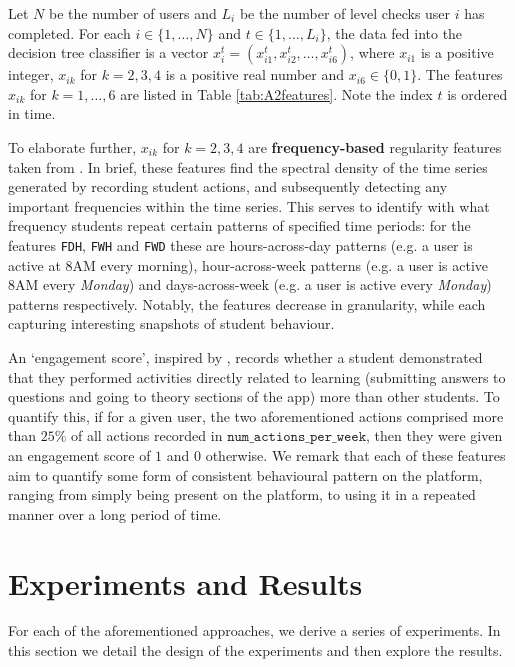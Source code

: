 \documentclass[sigplan,screen]{acmart}
\begin{document}
Let $N$ be the number of users and $L_i$ be the number of level checks user $i$ has completed. For each $i \in \{1,\ldots,N\}$ and $t \in \{1, \ldots, L_i\}$, the data fed into the decision tree classifier is a vector $x_i^t = (x_{i1}^t, x_{i2}^t, \ldots, x_{i6}^t)$, where $x_{i1}$ is a positive integer, $x_{ik}$ for $k=2,3,4$ is a positive real number and $x_{i6} \in \{0,1\}$. The features $x_{ik}$ for $k=1,\ldots, 6$ are listed in Table 
\ref{tab:A2features}. Note the index $t$ is ordered in time. 

To elaborate further, $x_{ik}$ for $k=2,3,4$ are \textbf{frequency-based} regularity features taken from \cite{quantifyreg}. In brief, these features find the spectral density of the time series generated by recording student actions, and subsequently detecting any important frequencies within the time series. This serves to identify with what frequency students repeat certain patterns of specified time periods: for the features \texttt{FDH}, \texttt{FWH} and \texttt{FWD} these are hours-across-day patterns (e.g. a user is active at 8AM every morning), hour-across-week patterns (e.g. a user is active 8AM every \textit{Monday}) and days-across-week (e.g. a user is active every \textit{Monday}) patterns respectively. Notably, the features decrease in granularity, while each capturing interesting snapshots of student behaviour. 

An `engagement score', inspired by \cite{student_engagement}, records whether a student demonstrated that they performed activities directly related to learning (submitting answers to questions and going to theory sections of the app) more than other students. To quantify this, if for a given user, the two aforementioned actions comprised more than $25\%$ of all actions recorded in $\texttt{num\_actions\_per\_week}$, then they were given an engagement score of $1$ and $0$ otherwise. We remark that each of these features aim to quantify some form of consistent behavioural pattern on the platform, ranging from simply being present on the platform, to using it in a repeated manner over a long period of time. 

\section{Experiments and Results}\label{sec:results}

For each of the aforementioned approaches, we derive a series of experiments. In this section we detail the design of the experiments and then explore the results.
\end{document}
